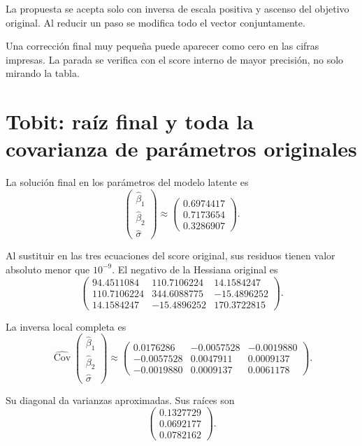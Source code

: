 \documentclass[11pt,a4paper]{article}
\DeclareMathOperator{\Cov}{Cov}
\begin{document}
La propuesta se acepta solo con
inversa de escala positiva
y ascenso del objetivo original.
Al reducir un paso se modifica
todo el vector conjuntamente.

Una corrección final muy pequeña
puede aparecer como cero
en las cifras impresas.
La parada se verifica con
el score interno de mayor precisión,
no solo mirando la tabla.

\clearpage
\section{Tobit: raíz final y toda la covarianza de parámetros originales}\label{unidad113}
La solución final en los parámetros
del modelo latente es
\[
\begin{pmatrix}\widehat\beta_1\\\widehat\beta_2\\\widehat\sigma\end{pmatrix}\approx\begin{pmatrix}0.6974417\\0.7173654\\0.3286907\end{pmatrix}.
\]

Al sustituir en las tres ecuaciones
del score original, sus residuos
tienen valor absoluto menor que \(10^{-9}\).
El negativo de la Hessiana original es
\[
\begin{pmatrix}94.4511084&110.7106224&14.1584247\\110.7106224&344.6088775&-15.4896252\\14.1584247&-15.4896252&170.3722815\end{pmatrix}.
\]

La inversa local completa es
\[
\widehat{\Cov}
\begin{pmatrix}\widehat\beta_1\\\widehat\beta_2\\\widehat\sigma\end{pmatrix}
\approx\begin{pmatrix}0.0176286&-0.0057528&-0.0019880\\-0.0057528&0.0047911&0.0009137\\-0.0019880&0.0009137&0.0061178\end{pmatrix}.
\]

Su diagonal da varianzas aproximadas.
Sus raíces son
\[
\begin{pmatrix}0.1327729\\0.0692177\\0.0782162\end{pmatrix}.
\]
\end{document}

